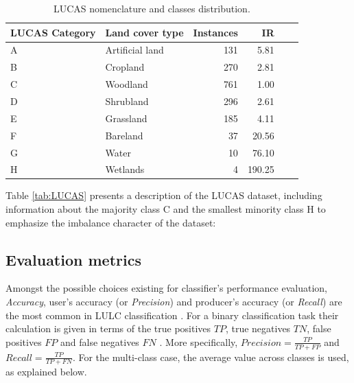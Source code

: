 \documentclass[remotesensing,article,submit,moreauthors,pdftex]{Definitions/mdpi}
\begin{document}
\begin{table}[H]
	\centering
	\begin{tabular}{llrrrr}
		\toprule
		\textbf{LUCAS Category} & \textbf{Land cover type} & \textbf{Instances}
		                        &\textbf{IR} \\
		\hline
		A                       & Artificial land          & 131
		& 5.81   \\
		B                       & Cropland                 & 270
		& 2.81   \\
		C                       & Woodland                 & 761
		& 1.00   \\
		D                       & Shrubland                & 296
		& 2.61   \\
		E                       & Grassland                & 185
		& 4.11   \\
		F                       & Bareland                 & 37
		& 20.56  \\
		G                       & Water                    & 10
		& 76.10  \\
		H                       & Wetlands                 & 4
		& 190.25 \\
		\bottomrule
	\end{tabular}
	\caption{\label{tab:classes_distribution}LUCAS nomenclature and classes
	distribution.}
\end{table}

Table \ref{tab:LUCAS} presents a description of the LUCAS dataset, including
information about the majority class C and the smallest minority class H to
emphasize the imbalance character of the dataset:


\subsection{Evaluation metrics}  \label{Evaluation metrics}

Amongst the possible choices existing for classifier's performance evaluation,
\textit{Accuracy}, user's accuracy (or \textit{Precision}) and
producer's accuracy (or \textit{Recall}) are the most common in LULC
classification \cite{Liu2007, Olofsson2013}. For a binary classification task
their calculation is given in terms of the true positives \( TP \), true
negatives \(TN \), false positives \( FP \) and false negatives \( FN \)
\cite{Liu2007}. More specifically,  \( \textit{Precision} =  \frac{TP}{TP + FP}
\) and \(\textit{Recall} =  \frac{TP}{TP + FN} \). For the multi-class case, the
average value across classes is used, as explained below.
\end{document}
